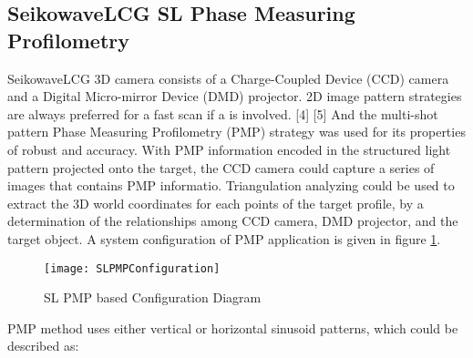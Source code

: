 \subsection{SeikowaveLCG SL Phase Measuring Profilometry}
SeikowaveLCG 3D camera consists of a Charge-Coupled Device (CCD) camera and a Digital Micro-mirror Device (DMD) projector. 2D image pattern strategies are always preferred for a fast scan if a is involved. 
[4]%
 [5] %
And the multi-shot pattern Phase Measuring Profilometry (PMP) strategy was used for its properties of robust and accuracy.
With PMP information encoded in the structured light pattern projected onto the target, the CCD camera could capture a series of images that contains PMP informatio. Triangulation analyzing could be used to extract the 3D world coordinates for each points of the target profile, by a determination of the relationships among CCD camera, DMD projector, and the target object. A system configuration of PMP application is given in figure \ref{SLPMPConfiguration}.\par%
%
\begin{figure}[h]
\centering
\texttt{[image: SLPMPConfiguration]}
\caption{SL PMP based Configuration Diagram}
\label{SLPMPConfiguration}
\end{figure}%
%
PMP method uses either vertical or horizontal sinusoid patterns, which could be described as:

